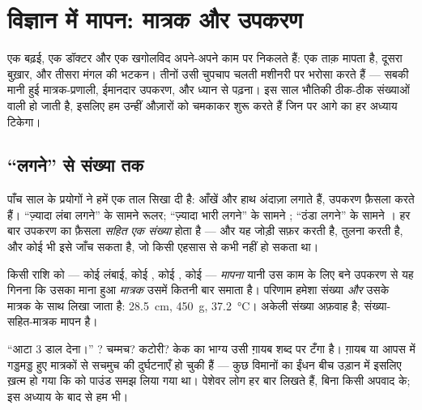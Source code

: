 \chapter{विज्ञान में मापन: मात्रक और उपकरण}\label{ch:g6:measurement-in-science}

एक बढ़ई, एक डॉक्टर और एक खगोलविद अपने-अपने काम पर निकलते हैं: एक ताक़
मापता है, दूसरा बुख़ार, और तीसरा मंगल की भटकन। तीनों उसी चुपचाप चलती
मशीनरी पर भरोसा करते हैं --- सबकी मानी हुई मात्रक-प्रणाली, ईमानदार
उपकरण, और ध्यान से पढ़ना। इस साल भौतिकी ठीक-ठीक संख्याओं वाली हो जाती
है, इसलिए हम उन्हीं औज़ारों को चमकाकर शुरू करते हैं जिन पर आगे का हर
अध्याय टिकेगा।

\section{``लगने'' से संख्या तक}

पाँच साल के प्रयोगों ने हमें एक ताल सिखा दी है: आँखें और हाथ अंदाज़ा
लगाते हैं, उपकरण फ़ैसला करते हैं। ``ज़्यादा लंबा लगने'' के सामने रूलर;
``ज़्यादा भारी लगने'' के सामने ; ``ठंडा लगने'' के सामने ।
हर बार उपकरण का फ़ैसला \emph{ सहित एक संख्या} होता है --- और यह
जोड़ी सफ़र करती है, तुलना करती है, और कोई भी इसे जाँच सकता है, जो
किसी एहसास से कभी नहीं हो सकता था।

\begin{definition}[किसी राशि को मापना]\label{def:g6:measurement-in-science:measuring}
किसी राशि को --- कोई लंबाई, कोई , कोई , कोई  ---
\emph{मापना} यानी उस काम के लिए बने उपकरण से यह गिनना कि
उसका माना हुआ \emph{मात्रक} उसमें कितनी बार समाता है।
परिणाम हमेशा संख्या \emph{और} उसके मात्रक के साथ लिखा जाता है:
\qty{28.5}{cm}, \qty{450}{g}, \qty{37.2}{\celsius}। अकेली संख्या
अफ़वाह है; संख्या-सहित-मात्रक मापन है।
\end{definition}

\begin{example}[ग़ायब मात्रक की क़ीमत]\label{ex:g6:measurement-in-science:missing}
``आटा 3 डाल देना।'' ? चम्मच? कटोरी? केक का भाग्य उसी ग़ायब शब्द
पर टँगा है। ग़ायब या आपस में गड्डमड्ड हुए मात्रकों से सचमुच की
दुर्घटनाएँ हो चुकी हैं --- कुछ विमानों का ईंधन बीच उड़ान में इसलिए
ख़त्म हो गया कि  को पाउंड समझ लिया गया था। पेशेवर लोग 
हर बार लिखते हैं, बिना किसी अपवाद के; इस अध्याय के बाद से हम भी।
\end{example}

